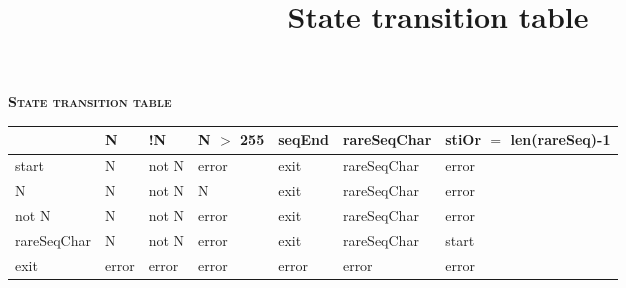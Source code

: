 \documentclass[12pt]{article}
\title {State transition table}
\begin{document}
	\begin{center}
		{\large \textbf{\textsc{State transition table}}}\\\vspace{12mm}

		\begin{tabular}{ | l | l | l | l | l | l | l |}
			\hline
    			& N & !N & N $>$ 255 & seqEnd & rareSeqChar & stiOr $=$ len(rareSeq)-1 \\ \hline
			start & N & not N & error & exit & rareSeqChar & error 		       \\ \hline
			N & N & not N & N & exit & rareSeqChar & error	 		       \\ \hline
			not N & N & not N & error & exit & rareSeqChar & error		       \\ \hline
			rareSeqChar & N & not N & error & exit & rareSeqChar & start	       \\ \hline
			exit  & error & error & error & error & error & error		       \\ \hline
				
		\end{tabular}
	\end{center}
\end{document}
